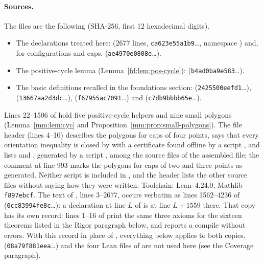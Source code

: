 \paragraph{Sources.}
{\raggedright
The files are the following (SHA-256, first 12 hexadecimal digits).
\begin{itemize}
\item The declarations treated here:  (2677 lines,
  \texttt{ca623e55a1b9}\dots, namespace ) and, for configurations and caps,
   (\texttt{ae4970e0808e}\dots).
\item The positive-cycle lemma (Lemma~\ref{fd:lem:pos-cycle}): 
  (\texttt{b4ad0ba9e583}\dots).
\item The basic definitions recalled in the foundations section: 
  (\texttt{2425500eefd1}\dots),  (\texttt{13667aa2d3dc}\dots),
   (\texttt{f67955ac7091}\dots) and
   (\texttt{c7db9bbbb65e}\dots).
\end{itemize}
Lines 22--1506 of
 hold five positive-cycle helpers and nine small polygons
(Lemma~\ref{mm:lem:cyc} and Proposition~\ref{mm:prop:small-polygons}). The file header (lines 4--10)
describes the polygons for caps of four points, says that every orientation inequality is closed by
 with a certificate found offline by a script , and lists
 and , generated by a script ,
among the source files of the assembled file; the comment at line 993 marks the polygons for caps of two
and three points as generated. Neither script is included in , and the header lists the
other source files without saying how they were written. Toolchain: Lean~4.24.0, Mathlib \texttt{f897ebcf}. The text of ,
lines 3--2677, occurs verbatim as lines 1562--4236 of 
(\texttt{0cc83994fe8c}\dots): a declaration at line $L$ of  is at
line $L+1559$ there. That copy has its own record: lines 1--16 of  print
the same three axioms for the sixteen theorems listed in the Rigor paragraph below, and
 reports a compile without errors. With this record in place of
, everything below applies to both copies.
 (\texttt{08a79f881eea}\dots) and the four Lean files of
 are not used here (see the Coverage paragraph).\par}

